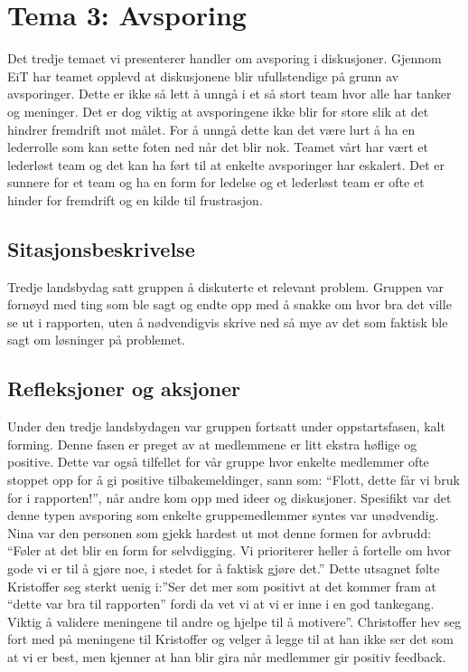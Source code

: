 \chapter{Tema 3: Avsporing}

Det tredje temaet vi presenterer handler om avsporing i diskusjoner. Gjennom EiT har teamet opplevd at diskusjonene
blir ufullstendige på grunn av avsporinger. Dette er ikke så lett å unngå i et så stort team hvor alle har tanker og meninger.
Det er dog viktig at avsporingene ikke blir for store slik at det hindrer fremdrift mot målet. For å unngå dette kan det være lurt
å ha en lederrolle som kan sette foten ned når det blir nok. Teamet vårt har vært et lederløst team og det kan ha ført til at 
enkelte avsporinger har eskalert. Det er sunnere for et team og ha en form for ledelse og et lederløst team er ofte et hinder for 
fremdrift og en kilde til frustrasjon.

\section{Sitasjonsbeskrivelse}

Tredje landsbydag satt gruppen å diskuterte et relevant problem. Gruppen var fornøyd med ting som ble sagt og endte opp med å snakke om hvor bra det ville se ut i rapporten, uten å nødvendigvis skrive ned så mye av det som faktisk ble sagt om løsninger på problemet.

\section{Refleksjoner og aksjoner}

Under den tredje landsbydagen var gruppen fortsatt under oppstartsfasen, kalt forming. Denne fasen er preget av at medlemmene er litt ekstra høflige og positive. Dette var også tilfellet for vår gruppe hvor enkelte medlemmer ofte stoppet opp for å gi positive tilbakemeldinger, sann som: “Flott, dette får vi bruk for i rapporten!”, når andre kom opp med ideer og diskusjoner. Spesifikt var det denne typen avsporing som enkelte gruppemedlemmer syntes var unødvendig. Nina var den personen som gjekk hardest ut mot denne formen for avbrudd: “Føler at det blir en form for selvdigging. Vi prioriterer heller å fortelle om hvor gode vi er til å gjøre noe, i stedet for å faktisk gjøre det.” Dette utsagnet følte Kristoffer seg sterkt uenig i:”Ser det mer som positivt at det kommer fram at “dette var bra til rapporten” fordi da vet vi at vi er inne i en god tankegang. Viktig å validere meningene til andre og hjelpe til å motivere”. Christoffer hev seg fort med på meningene til Kristoffer og velger å legge til at han ikke ser det som at vi er best, men kjenner at han blir gira når medlemmer gir positiv feedback. 

